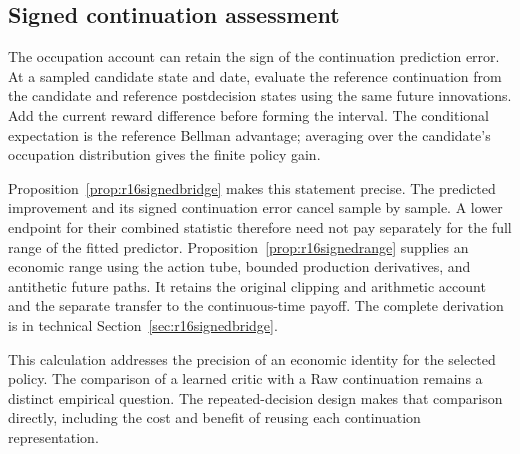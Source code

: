 \subsection{Signed continuation assessment}
\label{sec:r16signedsummary}
The occupation account can retain the sign of the continuation prediction error. At a sampled candidate state and date, evaluate the reference continuation from the candidate and reference postdecision states using the same future innovations. Add the current reward difference before forming the interval. The conditional expectation is the reference Bellman advantage; averaging over the candidate's occupation distribution gives the finite policy gain.

Proposition~\ref{prop:r16signedbridge} makes this statement precise. The predicted improvement and its signed continuation error cancel sample by sample. A lower endpoint for their combined statistic therefore need not pay separately for the full range of the fitted predictor. Proposition~\ref{prop:r16signedrange} supplies an economic range using the action tube, bounded production derivatives, and antithetic future paths. It retains the original clipping and arithmetic account and the separate transfer to the continuous-time payoff. The complete derivation is in technical Section~\ref{sec:r16signedbridge}.

This calculation addresses the precision of an economic identity for the selected policy. The comparison of a learned critic with a Raw continuation remains a distinct empirical question. The repeated-decision design makes that comparison directly, including the cost and benefit of reusing each continuation representation.
